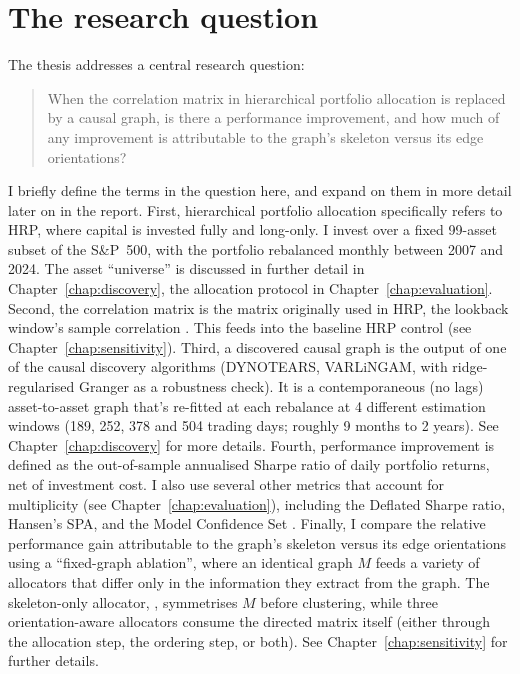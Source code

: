 \section{The research question}
\label{sec:question}

The thesis addresses a central research question:

\begin{quote}
When the
correlation matrix in hierarchical portfolio allocation is
replaced by a causal graph, is there a performance
improvement, and how much of any improvement is attributable
to the graph's skeleton versus its edge orientations?
\end{quote}

\noindent I briefly define the terms in the question here, and
expand on them in more detail later on in the report.
First, hierarchical portfolio allocation specifically refers to
HRP, where capital is invested fully and long-only. I invest over
a fixed 99-asset subset of the S\&P~500, with the portfolio
rebalanced monthly between 2007 and 2024. The asset ``universe''
is discussed in further detail in Chapter~\ref{chap:discovery},
the allocation protocol in Chapter~\ref{chap:evaluation}.
Second, the correlation matrix is the matrix originally used in HRP,
the lookback window's sample correlation
\cite{lopezdeprado2016hrp}. This feeds into the baseline HRP
control (see Chapter~\ref{chap:sensitivity}).
Third, a discovered causal graph is the output of one of the causal
discovery algorithms (DYNOTEARS, VARLiNGAM, with ridge-regularised
Granger as a robustness check). It is a contemporaneous (no lags)
asset-to-asset graph that's re-fitted at each rebalance
at 4 different estimation windows 
(189, 252, 378 and 504 trading days; roughly 9 months to 2 years).
See Chapter~\ref{chap:discovery} for more details.
Fourth, performance improvement is defined as the out-of-sample 
annualised Sharpe ratio of daily portfolio returns, net of 
investment cost. I also use several other metrics that account 
for multiplicity (see Chapter~\ref{chap:evaluation}), including the 
Deflated Sharpe ratio, Hansen's SPA, and the Model Confidence Set
\cite{bailey2014deflated,hansen2005spa,hansen2011mcs}.
Finally, I compare the relative performance gain attributable to
the graph's skeleton versus its edge orientations using a 
``fixed-graph ablation'', where an identical graph $M$ feeds
a variety of allocators that differ only in the information they
extract from the graph. The skeleton-only allocator, \skelsamp{},
symmetrises $M$ before clustering, while three 
orientation-aware allocators consume the directed matrix itself
(either through the allocation step, the ordering step, or both).
See Chapter~\ref{chap:sensitivity} for further details.

